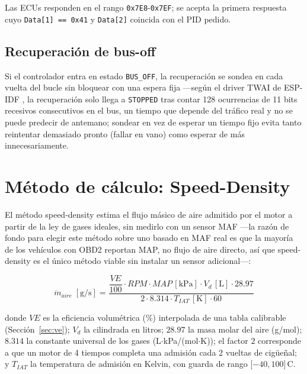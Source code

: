 Las ECUs responden en el rango \texttt{0x7E8}-\texttt{0x7EF}; se acepta la
primera respuesta cuyo \texttt{Data[1] == 0x41} y \texttt{Data[2]} coincida
con el PID pedido.

\subsection{Recuperación de bus-off}
Si el controlador entra en estado \texttt{BUS\_OFF}, la recuperación se
sondea en cada vuelta del bucle sin bloquear con una espera fija —según el
driver TWAI de ESP-IDF \cite{espressif2024trm}, la recuperación solo llega a
\texttt{STOPPED} tras contar 128 ocurrencias de 11 bits recesivos
consecutivos en el bus, un tiempo que depende del tráfico real y no se puede
predecir de antemano; sondear en vez de esperar un tiempo fijo evita tanto
reintentar demasiado pronto (fallar en vano) como esperar de más
innecesariamente.

\section{Método de cálculo: Speed-Density}
\label{sec:speeddensity}

El método speed-density estima el flujo másico de aire admitido por el motor
a partir de la ley de gases ideales, sin medirlo con un sensor MAF —la
razón de fondo para elegir este método sobre uno basado en MAF real es que
la mayoría de los vehículos con OBD2 reportan MAP, no flujo de aire directo,
así que speed-density es el único método viable sin instalar un sensor
adicional—:

\begin{equation}
\dot{m}_{aire} \;[\text{g/s}] =
\frac{\dfrac{VE}{100} \cdot RPM \cdot MAP\,[\text{kPa}] \cdot V_d\,[\text{L}] \cdot 28.97}
     {2 \cdot 8.314 \cdot T_{IAT}\,[\text{K}] \cdot 60}
\end{equation}

donde $VE$ es la eficiencia volumétrica (\%) interpolada de una tabla
calibrable (Sección~\ref{sec:ve}); $V_d$ la cilindrada en litros; $28.97$ la
masa molar del aire (g/mol); $8.314$ la constante universal de los gases
(L$\cdot$kPa/(mol$\cdot$K)); el factor $2$ corresponde a que un motor de 4
tiempos completa una admisión cada 2 vueltas de cigüeñal; y $T_{IAT}$ la
temperatura de admisión en Kelvin, con guarda de rango
[$-40$,\,$100$]\,\textdegree C.

